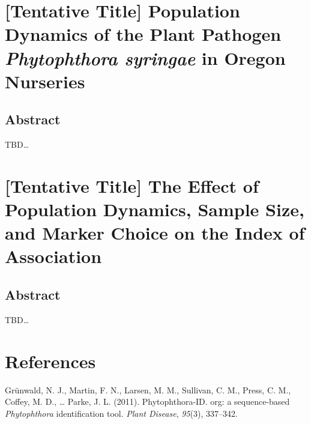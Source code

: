 \documentclass[double,12pt]{beavtex}
\begin{document}
  \chapter{\texorpdfstring{{[}Tentative Title{]} Population Dynamics of
  the Plant Pathogen \emph{Phytophthora syringae} in Oregon
  Nurseries}{{[}Tentative Title{]} Population Dynamics of the Plant Pathogen Phytophthora syringae in Oregon Nurseries}}\label{tentative-title-population-dynamics-of-the-plant-pathogen-phytophthora-syringae-in-oregon-nurseries}
  
  \section{Abstract}\label{abstract-3}
  
  TBD\ldots{}
  
  \chapter{{[}Tentative Title{]} The Effect of Population Dynamics, Sample
  Size, and Marker Choice on the Index of
  Association}\label{tentative-title-the-effect-of-population-dynamics-sample-size-and-marker-choice-on-the-index-of-association}
  
  \section{Abstract}\label{abstract-4}
  
  TBD\ldots{}
  
  \backmatter
  
  \chapter{References}\label{references}
  
  \noindent
  
  \setlength{\parindent}{-0.20in} \setlength{\leftskip}{0.20in}
  \setlength{\parskip}{8pt}
  
  \hypertarget{refs}{}
  \hypertarget{ref-grunwald2011phytophthora}{}
  Grünwald, N. J., Martin, F. N., Larsen, M. M., Sullivan, C. M., Press,
  C. M., Coffey, M. D., \ldots{} Parke, J. L. (2011). Phytophthora-ID.
  org: a sequence-based \emph{Phytophthora} identification tool.
  \emph{Plant Disease}, \emph{95}(3), 337--342.
\end{document}
